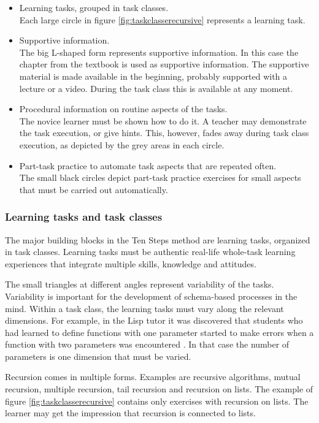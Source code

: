\begin{itemize}
\item Learning tasks, grouped in task classes.\\
Each large circle in figure \ref{fig:taskclasserecursive} represents a learning task.
\item Supportive information.\\
The big L-shaped form represents supportive information. In this case the chapter from the textbook is used as supportive information.
The supportive material is made available in the beginning, probably supported with a lecture or a video. 
During the task class this is available at any moment.
\item Procedural information on routine aspects of the tasks.\\
The novice learner must be shown how to do it. 
A teacher may demonstrate the task execution, or give hints.
This, however, fades away during task class execution, as depicted by the grey areas in each circle.
\item Part-task practice to automate task aspects that are repeated often.\\
The small black circles depict part-task practice exercises for small aspects that must be carried out automatically.
\end{itemize}



\subsubsection{Learning tasks and task classes}
The major building blocks in the Ten Steps method are learning tasks, organized in task classes. 
Learning tasks must be authentic real-life whole-task learning experiences that integrate multiple skills, knowledge and attitudes.

The small triangles at different angles represent variability of the tasks. 
Variability is important for the development of schema-based processes in the mind.
Within a task class, the learning tasks must vary along the relevant dimensions.
For example, in the Lisp tutor it was discovered that students who had learned to define functions with one parameter started to
make errors when a function with two parameters was encountered \citep{corbett_1995}.
In that case the number of parameters is one dimension that must be varied.

Recursion comes in multiple forms.
Examples are recursive algorithms, mutual recursion, multiple recursion, tail recursion and recursion on lists.
The example of figure \ref{fig:taskclasserecursive} contains only exercises with recursion on lists.
The learner may get the impression that recursion is connected to  lists.

